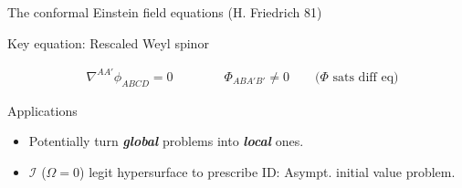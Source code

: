 \documentclass[10pt]{beamer}
\theoremstyle{plain}
\begin{document}
\begin{frame}{The conformal Einstein field equations (H. Friedrich 81)}
\begin{block}{Key equation: Rescaled Weyl spinor}
\begin{itemize}
\begin{align}
    & \boxed{\nabla^{AA'}\phi_{ABCD}=0} \qquad \qquad \Phi_{ABA'B'} \neq 0 \qquad \text{($\Phi$ sats diff eq)} \nonumber 
    \end{align}
  \end{itemize}
\end{block}
\vspace{-5mm}
\begin{exampleblock}{Applications}
  \begin{itemize}
    \item Potentially turn {\bf{\emph{global}}} problems into {\bf{\emph{local}}} ones.
  \item $\mathscr{I}$ ($\Omega=0$) legit hypersurface to prescribe ID: Asympt. initial value problem. 
    \end{itemize}
  \end{exampleblock}
\end{frame}
\end{document}
